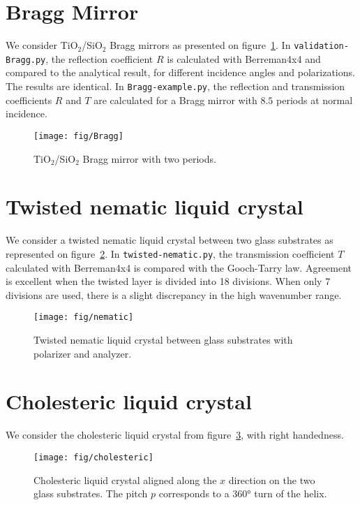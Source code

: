 \section{Bragg Mirror}
We consider TiO$_2$/SiO$_2$ Bragg mirrors as presented on figure~\ref{fig:Bragg}.
In \verb/validation-Bragg.py/, the reflection coefficient $R$ is calculated with Berreman4x4 and compared to the analytical result, for different incidence angles and polarizations. 
The results are identical.
In \verb/Bragg-example.py/, the reflection and transmission coefficients $R$ and $T$ are calculated for a Bragg mirror with $8.5$ periods at normal incidence.
\begin{figure}[!h]
\texttt{[image: fig/Bragg]}
\caption{\label{fig:Bragg}TiO$_2$/SiO$_2$ Bragg mirror with two periods.}
\end{figure}

\section{Twisted nematic liquid crystal}
We consider a twisted nematic liquid crystal between two glass substrates as represented on figure~\ref{fig:nematic}.  
In \verb/twisted-nematic.py/, the transmission coefficient $T$ calculated with Berreman4x4 is compared with the Gooch-Tarry law.
Agreement is excellent when the twisted layer is divided into 18 divisions.
When only 7 divisions are used, there is a slight discrepancy in the high wavenumber range.

\begin{figure}[!h]
\begin{center}
\texttt{[image: fig/nematic]}
\caption{\label{fig:nematic} Twisted nematic liquid crystal between glass substrates with polarizer and analyzer.}
\end{center}
\end{figure}

\section{Cholesteric liquid crystal}
We consider the cholesteric liquid crystal from figure~\ref{fig:cholesteric}, with right handedness.

\begin{figure}[!h]
\begin{center}
\texttt{[image: fig/cholesteric]}
\end{center}
\caption{\label{fig:cholesteric}Cholesteric liquid crystal aligned along the $x$ direction on the two glass substrates. The pitch $p$ corresponds to a 360° turn of the helix.}
\end{figure}

